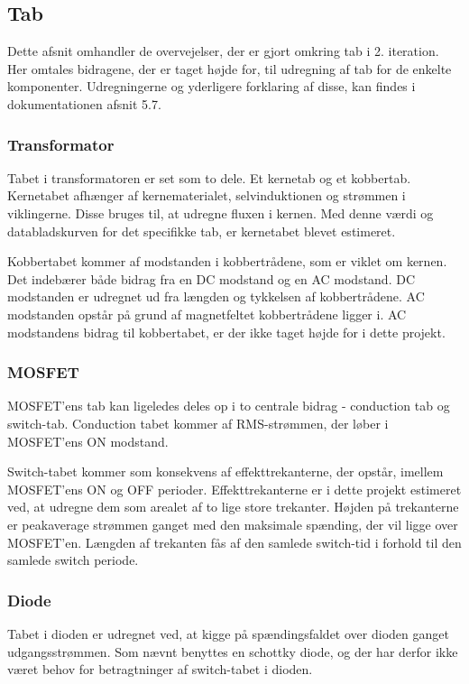 \subsection{Tab} \label{tab}
Dette afsnit omhandler de overvejelser, der er gjort omkring tab i 2. iteration. Her omtales bidragene, der er taget højde for, til udregning af tab for de enkelte komponenter. Udregningerne og yderligere forklaring af disse, kan findes i dokumentationen afsnit 5.7.

\subsubsection{Transformator}
\noindent Tabet i transformatoren er set som to dele. Et kernetab og et kobbertab. Kernetabet afhænger af  kernematerialet, selvinduktionen og strømmen i viklingerne. Disse bruges til, at udregne fluxen i kernen. Med denne værdi og databladskurven for det specifikke tab, er kernetabet blevet estimeret. 

Kobbertabet kommer af modstanden i kobbertrådene, som er viklet om kernen. Det indebærer både bidrag fra en DC modstand og en AC modstand. DC modstanden er udregnet ud fra længden og tykkelsen af kobbertrådene. AC modstanden opstår på grund af magnetfeltet kobbertrådene ligger i. AC modstandens bidrag til kobbertabet, er der ikke taget højde for i dette projekt.  

\subsubsection{MOSFET}
\noindent MOSFET'ens tab kan ligeledes deles op i to centrale bidrag - conduction tab og switch-tab. Conduction tabet kommer af RMS-strømmen, der løber i MOSFET'ens ON modstand. 

Switch-tabet kommer som konsekvens af effekttrekanterne, der opstår, imellem MOSFET'ens ON og OFF perioder. Effekttrekanterne er i dette projekt estimeret ved, at udregne dem som arealet af to lige store trekanter. Højden på trekanterne er peakaverage strømmen ganget med den maksimale spænding, der vil ligge over MOSFET'en. Længden af trekanten fås af den samlede switch-tid i forhold til den samlede switch periode. 

\subsubsection{Diode}
\noindent Tabet i dioden er udregnet ved, at kigge på spændingsfaldet over dioden ganget udgangsstrømmen. Som nævnt benyttes en schottky diode, og der har derfor ikke været behov for betragtninger af switch-tabet i dioden. 
  

